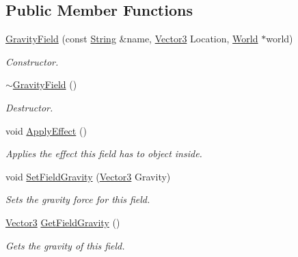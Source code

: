 \subsection*{Public Member Functions}
\begin{DoxyCompactItemize}
\item 
\hyperlink{classphys_1_1GravityField_a7a5ebfbd93b166aab3d586270f9b8724}{GravityField} (const \hyperlink{namespacephys_aa03900411993de7fbfec4789bc1d392e}{String} \&name, \hyperlink{classphys_1_1Vector3}{Vector3} Location, \hyperlink{classphys_1_1World}{World} $\ast$world)
\begin{DoxyCompactList}\small\item\em Constructor. \item\end{DoxyCompactList}\item 
\hyperlink{classphys_1_1GravityField_ae41a656b247a2982da2e1ae666c605d0}{$\sim$GravityField} ()
\begin{DoxyCompactList}\small\item\em Destructor. \item\end{DoxyCompactList}\item 
void \hyperlink{classphys_1_1GravityField_a0322cb1635bbcb951493d9e17cc9acb1}{ApplyEffect} ()
\begin{DoxyCompactList}\small\item\em Applies the effect this field has to object inside. \item\end{DoxyCompactList}\item 
void \hyperlink{classphys_1_1GravityField_a7cebfe216580e9ef607a2ea070cbeaec}{SetFieldGravity} (\hyperlink{classphys_1_1Vector3}{Vector3} Gravity)
\begin{DoxyCompactList}\small\item\em Sets the gravity force for this field. \item\end{DoxyCompactList}\item 
\hyperlink{classphys_1_1Vector3}{Vector3} \hyperlink{classphys_1_1GravityField_ae776978b7e8fa1d656bdb216aa6f2d20}{GetFieldGravity} ()
\begin{DoxyCompactList}\small\item\em Gets the gravity of this field. \item\end{DoxyCompactList}\end{DoxyCompactItemize}
